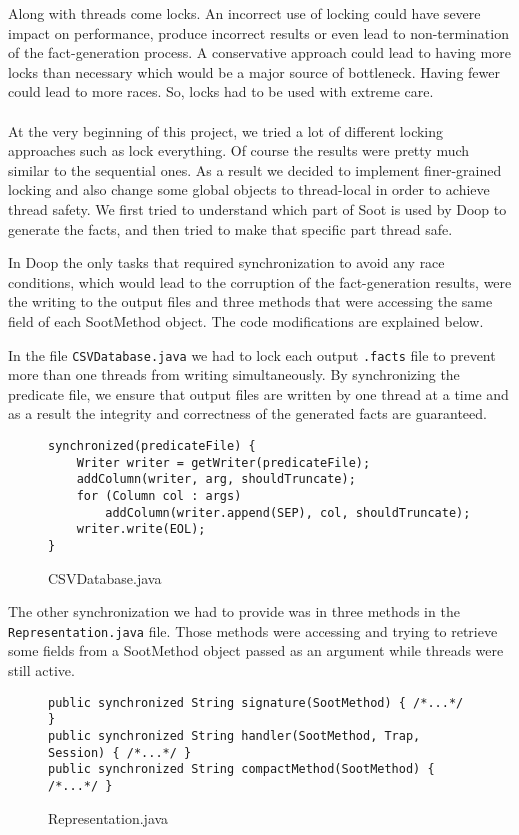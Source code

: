 \documentclass{dithesis}
\begin{document}
\label{Ch:Locking}
	Along with threads come locks. An incorrect use of locking could have severe impact on performance, produce incorrect results or even lead to non-termination of the fact-generation process. A conservative approach could lead to having more locks than necessary which would be a major source of bottleneck. Having fewer could lead to more races. So, locks had to be used with extreme care.
    \\
    \\
	At the very beginning of this project, we tried a lot of different locking approaches such as lock everything. Of course the results were pretty much similar to the sequential ones. As a result we decided to implement finer-grained locking and also change some global objects to thread-local in order to achieve thread safety. We first tried to understand which part of Soot is used by Doop to generate the facts, and then tried to make that specific part thread safe.


    	In Doop the only tasks that required synchronization to avoid any race conditions, which would lead to the corruption of the fact-generation results, were the writing to the output files and three methods that were accessing the same field of each SootMethod object. The code modifications are explained below.

	    	In the file \texttt{CSVDatabase.java} we had to lock each output \texttt{.facts} file to prevent more than one threads from writing simultaneously. By synchronizing the predicate file, we ensure that output files are written by one thread at a time and as a result the integrity and correctness of the generated facts are guaranteed.
	    	\begin{figure}[H]
\begin{lstlisting}
synchronized(predicateFile) {
    Writer writer = getWriter(predicateFile);
    addColumn(writer, arg, shouldTruncate);
    for (Column col : args)
        addColumn(writer.append(SEP), col, shouldTruncate);
    writer.write(EOL);
}
\end{lstlisting}
	        \caption{CSVDatabase.java}
	        \end{figure}

	    	The other synchronization we had to provide was in three methods in the \texttt{Representation.java} file. Those methods were accessing and trying to retrieve some fields from a SootMethod object passed as an argument while threads were still active.
	    	\begin{figure}[H]
\begin{lstlisting}
public synchronized String signature(SootMethod) { /*...*/ }
public synchronized String handler(SootMethod, Trap, Session) { /*...*/ }
public synchronized String compactMethod(SootMethod) { /*...*/ }
\end{lstlisting}
	        \caption{Representation.java}
	        \end{figure}
\end{document}
